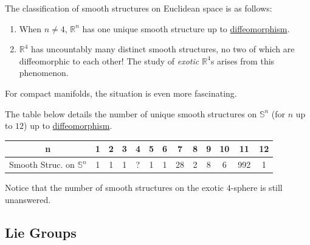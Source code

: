 \documentclass{article}
\newcounter{theorem}[section]
\begin{document}
      \begin{theorem}
        \label{thm:classification-of-nondiffeomorphic-smooth}
        The classification of smooth structures on Euclidean space is as follows: 
        \begin{enumerate}
          \item When $n \neq 4$, $\mathbb{R}^n$ has one unique smooth structure up to \hyperref[def:diffeomorphism-2]{diffeomorphism}.
          \item $\mathbb{R}^4$ has uncountably many distinct smooth structures, no two of which are diffeomorphic to each other! The study of \textit{exotic $\mathbb{R}^4$}s arises from this phenomenon. 
        \end{enumerate}
      \end{theorem}

      For compact manifolds, the situation is even more fascinating.

      \begin{theorem}
        \label{thm:classification-of-nondiffeomorphic-smooth-2}
        The table below details the number of unique smooth structures on $\mathbb{S}^n$ (for $n$ up to $12$) up to \hyperref[def:diffeomorphism-2]{diffeomorphism}. 

        \begin{center}
        \begin{tabular}{c|c|c|c|c|c|c|c|c|c|c|c|c}
          n & 1 & 2&3&4&5&6&7&8&9&10&11&12 \\
          \hline
          Smooth Struc. on $\mathbb{S}^n$ & 1&1&1&?&1&1&28&2&8&6&992&1
        \end{tabular}
        \end{center}

        Notice that the number of smooth structures on the exotic $4$-sphere is still unanswered. 
      \end{theorem}

  \subsection{Lie Groups}
\end{document}
